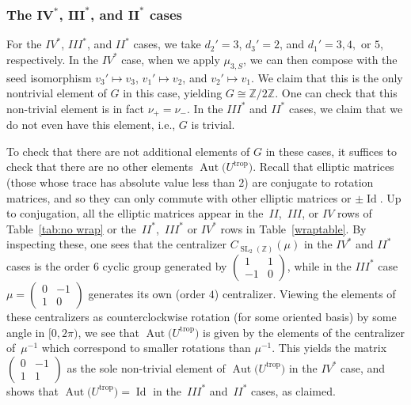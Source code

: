 \documentclass[pdftex]{sigma}
\numberwithin{equation}{section}
\numberwithin{figure}{section}
\numberwithin{table}{section}
\DeclareMathOperator{\Id}{Id}
\DeclareMathOperator{\SL}{SL}
\DeclareMathOperator{\trop}{trop}
\DeclareMathOperator{\Aut}{Aut}
\let\bb=\mathbb
\theoremstyle{definition}
\begin{document}
\subsubsection[The $IV^*$, $III^*$, and $II^*$ cases]{The $\boldsymbol{IV^*}$, $\boldsymbol{III^*}$, and $\boldsymbol{II^*}$ cases}

For the $IV^*$, $III^*$, and $II^*$ cases, we take $d_2'=3$, $d_3'=2$, and $d_1'=3,4,$ or $5$, respectively. In the $IV^*$ case, when we apply $\mu_{3,S}$, we can then compose with the seed isomorphism $v_3'\mapsto v_3$, $v_1'\mapsto v_2$, and $v_2'\mapsto v_1$. We claim that this is the only nontrivial element of $G$ in this case, yielding $G\cong \bb{Z}/2\bb{Z}$. One can check that this non-trivial element is in fact $\nu_{+}=\nu_-$. In the $III^*$ and $II^*$ cases, we claim that we do not even have this element, i.e., $G$ is trivial.

To check that there are not additional elements of $G$ in these cases, it suffices to check that there are no other elements $\Aut\big(U^{\trop}\big)$. Recall that elliptic matrices (those whose trace has absolute value less than $2$) are conjugate to rotation matrices, and so they can only commute with other elliptic matrices or $\pm \Id$. Up to conjugation, all the elliptic matrices appear in the~$II$,~$III$, or $IV$ rows of Table~\ref{tab:no wrap} or the~$II^*$,~$III^*$ or $IV^*$ rows in Table~\ref{wraptable}. By inspecting these, one sees that the centralizer $C_{\SL_2(\bb{Z})}(\mu)$ in the $IV^*$ and $II^*$ cases is the order $6$ cyclic group generated by $\left(\begin{smallmatrix} 1 & 1 \\ -1 & 0\end{smallmatrix}\right)$, while in the $III^*$ case $\mu=\left(\begin{smallmatrix} 0 & -1 \\ 1 & 0\end{smallmatrix}\right)$ generates its own (order $4$) centralizer. Viewing the elements of these centralizers as counterclockwise rotation (for some oriented basis) by some angle in $[0,2\pi)$, we see that $\Aut\big(U^{\trop}\big)$ is given by the elements of the centralizer of~$\mu^{-1}$ which correspond to smaller rotations than $\mu^{-1}$. This yields the matrix $\left(\begin{smallmatrix} 0 & -1 \\ 1 & 1\end{smallmatrix}\right)$ as the sole non-trivial element of $\Aut\big(U^{\trop}\big)$ in the $IV^*$ case, and shows that $\Aut\big(U^{\trop}\big)={\Id}$ in the~$III^*$ and~$II^*$ cases, as claimed.
\end{document}
